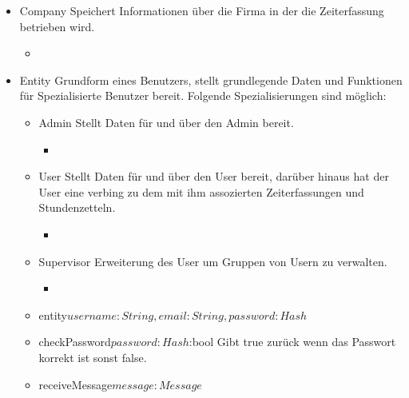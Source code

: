         \begin{itemize}
            \item{Company}
                Speichert Informationen über die Firma in der die Zeiterfassung betrieben wird.
                \begin{itemize}
                    \item{}
                \end{itemize}

            \item{Entity}
                Grundform eines Benutzers, stellt grundlegende Daten und Funktionen für Spezialisierte Benutzer bereit.
                Folgende Spezialisierungen sind möglich:
                \begin{itemize}
                    \item{Admin}
                        Stellt Daten für und über den Admin bereit.
                    \begin{itemize}
                        \item{}
                    \end{itemize}

                    \item{User}
                        Stellt Daten für und über den User bereit, darüber hinaus hat der User eine verbing zu dem mit ihm assozierten Zeiterfassungen und Stundenzetteln.
                        \begin{itemize}
                            \item{}
                        \end{itemize}

                    \item{Supervisor}
                        Erweiterung des User um Gruppen von Usern zu verwalten.
                        \begin{itemize}
                            \item{}
                        \end{itemize}

                \end{itemize}
                \begin{itemize}
                    \item{entity\(username:String , email:String, password:Hash\)}
                    \item{checkPassword\(password:Hash\):bool}
                        Gibt true zurück wenn das Passwort korrekt ist sonst false.
                    \item{receiveMessage\(message:Message\)}
                \end{itemize}


\end{itemize}
